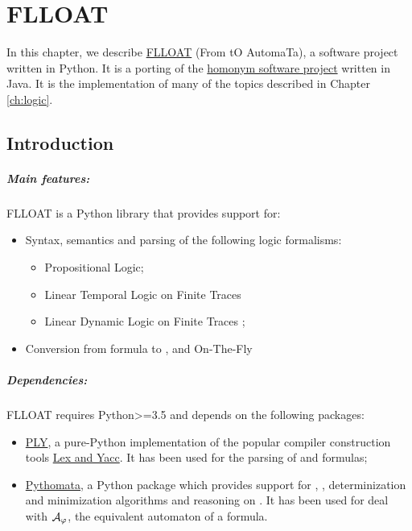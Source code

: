 \chapter{FLLOAT}\label{ch:flloat}
In this chapter, we describe \href{https://github.com/MarcoFavorito/flloat.git}{FLLOAT} (From \LLf tO AutomaTa), a software project written in Python. It is a porting of the \href{https://github.com/RiccardoDeMasellis/FLLOAT}{homonym software project} written in Java. It is the implementation of many of the topics described in Chapter \ref{ch:logic}. 


\section{Introduction}
\paragraph{Main features:} FLLOAT is a Python library that provides support for:
\begin{itemize}
	
	\item Syntax, semantics and parsing of the following logic formalisms:
	\begin{itemize}
		\item Propositional Logic;
		\item Linear Temporal Logic on Finite Traces \LTLf
		\item Linear Dynamic Logic on Finite Traces \LDLf;
	\end{itemize}
	\item Conversion from \LLf formula to \NFA, \DFA and \DFA On-The-Fly
	
\end{itemize}

\paragraph{Dependencies:} FLLOAT requires Python>=3.5 and depends on the following packages:
\begin{itemize}
	\item \href{http://www.dabeaz.com/ply/ply.html}{PLY}, a pure-Python implementation of the popular compiler construction tools \href{http://dinosaur.compilertools.net/}{Lex and Yacc}. It has been used for the parsing of \PL and \LLf formulas;
	\item \href{https://github.com/MarcoFavorito/pythomata}{Pythomata}, a Python package which provides support for \NFA, \DFA, determinization and minimization algorithms and reasoning on \DFAs. It has been used for deal with $\mathcal{A}_\varphi$, the equivalent automaton of a \LLf formula.
\end{itemize}

